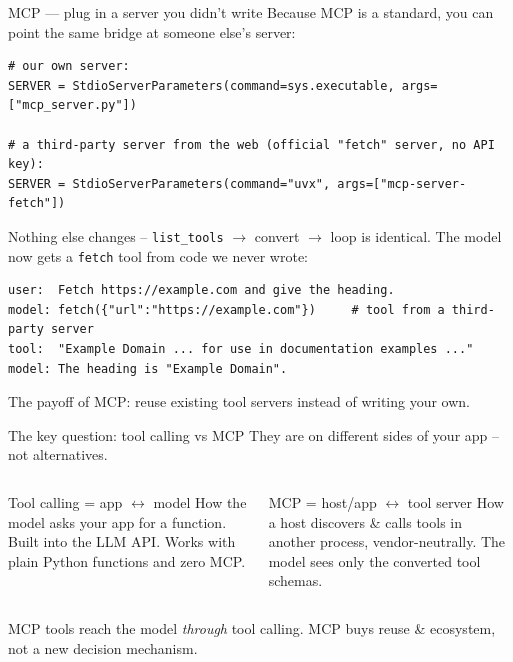 \documentclass[aspectratio=169,10pt]{beamer}
\begin{document}
\begin{frame}[fragile]{MCP --- plug in a server you didn't write}
  Because MCP is a standard, you can point the \alert{same bridge} at someone else's server:
\begin{lstlisting}
# our own server:
SERVER = StdioServerParameters(command=sys.executable, args=["mcp_server.py"])

# a third-party server from the web (official "fetch" server, no API key):
SERVER = StdioServerParameters(command="uvx", args=["mcp-server-fetch"])
\end{lstlisting}
  \footnotesize Nothing else changes -- \texttt{list\_tools} $\rightarrow$ convert $\rightarrow$ loop is identical. The model now gets a \texttt{fetch} tool from code we never wrote:
\begin{lstlisting}[style=ascii]
user:  Fetch https://example.com and give the heading.
model: fetch({"url":"https://example.com"})     # tool from a third-party server
tool:  "Example Domain ... for use in documentation examples ..."
model: The heading is "Example Domain".
\end{lstlisting}
  \footnotesize \alert{The payoff of MCP:} reuse existing tool servers instead of writing your own.
\end{frame}

\begin{frame}[fragile]{The key question: tool calling vs MCP}
  They are on \alert{different sides} of your app -- not alternatives.
  \begin{columns}[T]
    \begin{block}{Tool calling = app $\leftrightarrow$ model}
      \footnotesize How the \alert{model asks} your app for a function. Built into the LLM
      API. Works with plain Python functions and \alert{zero MCP}.
    \end{block}
    \begin{block}{MCP = host/app $\leftrightarrow$ tool server}
      \footnotesize How a host \alert{discovers \& calls} tools in another process,
      vendor-neutrally. The model sees only the converted tool schemas.
    \end{block}
  \end{columns}
  \begin{center}
  \end{center}
  \footnotesize MCP tools reach the model \emph{through} tool calling. MCP buys \alert{reuse \& ecosystem}, not a new decision mechanism.
\end{frame}
\end{document}
